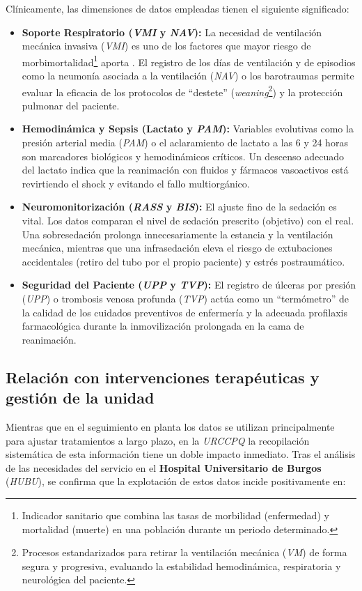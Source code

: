 Clínicamente, las dimensiones de datos empleadas tienen el siguiente significado:

\begin{itemize}
    \item \textbf{Soporte Respiratorio (\textit{VMI} y \textit{NAV}):} La necesidad de ventilación mecánica invasiva (\textit{VMI}) es uno de los factores que mayor riesgo de morbimortalidad\footnote{Indicador sanitario que combina las tasas de morbilidad (enfermedad) y mortalidad (muerte) en una población durante un periodo determinado.} aporta \cite{BOSCH_COSTAFREDA2014}. El registro de los días de ventilación y de episodios como la neumonía asociada a la ventilación (\textit{NAV}) o los barotraumas permite evaluar la eficacia de los protocolos de ``destete'' (\textit{weaning}\footnote{Procesos estandarizados para retirar la ventilación mecánica (\textit{VM}) de forma segura y progresiva, evaluando la estabilidad hemodinámica, respiratoria y neurológica del paciente.}) y la protección pulmonar del paciente.
    \item \textbf{Hemodinámica y Sepsis (Lactato y \textit{PAM}):} Variables evolutivas como la presión arterial media (\textit{PAM}) o el aclaramiento de lactato a las 6 y 24 horas son marcadores biológicos y hemodinámicos críticos. Un descenso adecuado del lactato indica que la reanimación con fluidos y fármacos vasoactivos está revirtiendo el shock y evitando el fallo multiorgánico. \cite{pam}
    \item \textbf{Neuromonitorización (\textit{RASS} y \textit{BIS}):} El ajuste fino de la sedación es vital. Los datos comparan el nivel de sedación prescrito (objetivo) con el real. Una sobresedación prolonga innecesariamente la estancia y la ventilación mecánica, mientras que una infrasedación eleva el riesgo de extubaciones accidentales (retiro del tubo por el propio paciente) y estrés postraumático. \cite{sedacion}
    \item \textbf{Seguridad del Paciente (\textit{UPP} y \textit{TVP}):} El registro de úlceras por presión (\textit{UPP}) o trombosis venosa profunda (\textit{TVP}) actúa como un ``termómetro'' de la calidad de los cuidados preventivos de enfermería y la adecuada profilaxis farmacológica durante la inmovilización prolongada en la cama de reanimación. \cite{termometro}
\end{itemize}

\subsection{Relación con intervenciones terapéuticas y gestión de la unidad}
Mientras que en el seguimiento en planta los datos se utilizan principalmente para ajustar tratamientos a largo plazo, en la \textit{URCCPQ} la recopilación sistemática de esta información tiene un doble impacto inmediato. Tras el análisis de las necesidades del servicio en el \textbf{Hospital Universitario de Burgos} (\textit{HUBU}), se confirma que la explotación de estos datos incide positivamente en:

